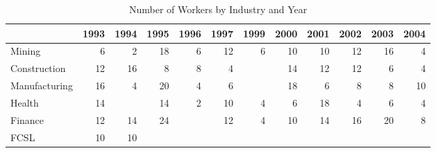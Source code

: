 \documentclass{article}
\begin{document}
\begin{table}[htbp] 
\centering 
\begin{threeparttable} 
\caption{Number of Workers by Industry and Year} 

\centering
\begin{tabular}{llllllllllll}
\toprule
\multicolumn{1}{c}{} &
  \multicolumn{1}{r}{1993} &
  \multicolumn{1}{r}{1994} &
  \multicolumn{1}{r}{1995} &
  \multicolumn{1}{r}{1996} &
  \multicolumn{1}{r}{1997} &
  \multicolumn{1}{r}{1999} &
  \multicolumn{1}{r}{2000} &
  \multicolumn{1}{r}{2001} &
  \multicolumn{1}{r}{2002} &
  \multicolumn{1}{r}{2003} &
  \multicolumn{1}{r}{2004} \\
\midrule
\multicolumn{1}{l}{Mining} &
  \multicolumn{1}{r}{6} &
  \multicolumn{1}{r}{2} &
  \multicolumn{1}{r}{18} &
  \multicolumn{1}{r}{6} &
  \multicolumn{1}{r}{12} &
  \multicolumn{1}{r}{6} &
  \multicolumn{1}{r}{10} &
  \multicolumn{1}{r}{10} &
  \multicolumn{1}{r}{12} &
  \multicolumn{1}{r}{16} &
  \multicolumn{1}{r}{4} \\
\multicolumn{1}{l}{Construction} &
  \multicolumn{1}{r}{12} &
  \multicolumn{1}{r}{16} &
  \multicolumn{1}{r}{8} &
  \multicolumn{1}{r}{8} &
  \multicolumn{1}{r}{4} &
  \multicolumn{1}{r}{} &
  \multicolumn{1}{r}{14} &
  \multicolumn{1}{r}{12} &
  \multicolumn{1}{r}{12} &
  \multicolumn{1}{r}{6} &
  \multicolumn{1}{r}{4} \\
\multicolumn{1}{l}{Manufacturing} &
  \multicolumn{1}{r}{16} &
  \multicolumn{1}{r}{4} &
  \multicolumn{1}{r}{20} &
  \multicolumn{1}{r}{4} &
  \multicolumn{1}{r}{6} &
  \multicolumn{1}{r}{} &
  \multicolumn{1}{r}{18} &
  \multicolumn{1}{r}{6} &
  \multicolumn{1}{r}{8} &
  \multicolumn{1}{r}{8} &
  \multicolumn{1}{r}{10} \\
\multicolumn{1}{l}{Health} &
  \multicolumn{1}{r}{14} &
  \multicolumn{1}{r}{} &
  \multicolumn{1}{r}{14} &
  \multicolumn{1}{r}{2} &
  \multicolumn{1}{r}{10} &
  \multicolumn{1}{r}{4} &
  \multicolumn{1}{r}{6} &
  \multicolumn{1}{r}{18} &
  \multicolumn{1}{r}{4} &
  \multicolumn{1}{r}{6} &
  \multicolumn{1}{r}{4} \\
\multicolumn{1}{l}{Finance} &
  \multicolumn{1}{r}{12} &
  \multicolumn{1}{r}{14} &
  \multicolumn{1}{r}{24} &
  \multicolumn{1}{r}{} &
  \multicolumn{1}{r}{12} &
  \multicolumn{1}{r}{4} &
  \multicolumn{1}{r}{10} &
  \multicolumn{1}{r}{14} &
  \multicolumn{1}{r}{16} &
  \multicolumn{1}{r}{20} &
  \multicolumn{1}{r}{8} \\
\multicolumn{1}{l}{FCSL} &
  \multicolumn{1}{r}{10} &
  \multicolumn{1}{r}{10} &

\end{tabular}
\end{threeparttable}
\end{table}
\end{document}
